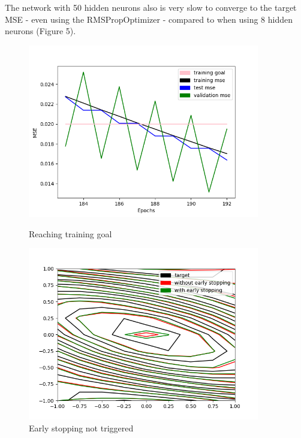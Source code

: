 \documentclass[11pt]{article}
\begin{document}
\begin{enumerate}
The network with 50 hidden neurons also is very slow to converge to the target MSE - even using the RMSPropOptimizer - compared to when using 8 hidden neurons (Figure 5).\newline

\begin{figure}[h!]
    \centering
    \begin{minipage}{0.45\textwidth}
        \centering
        \includegraphics[width=0.9\textwidth]{q1c-3} %
        \caption{Reaching training goal}
    \end{minipage}\hfill
    \begin{minipage}{0.45\textwidth}
        \centering
        \includegraphics[width=0.9\textwidth]{q1c-32} %
        \caption{Early stopping not triggered}
    \end{minipage}
\end{figure}


\end{enumerate}
\end{document}
